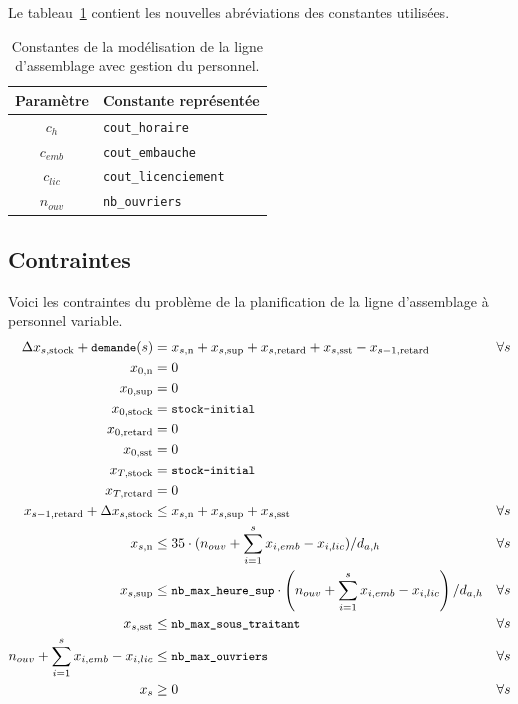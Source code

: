 \documentclass[12pt,oneside,a4paper]{article}
\newcommand{\myX}[2]{x_{#1,\text{#2}}}
\newcommand{\xSemaine}[1]{\myX{s}{#1}}
\newcommand{\xn}{\xSemaine{n}}
\newcommand{\xsup}{\xSemaine{sup}}
\newcommand{\xstock}{\xSemaine{stock}}
\newcommand{\xretard}{\xSemaine{retard}}
\newcommand{\xsst}{\xSemaine{sst}}
\newcommand{\texttts}[1]{{\small\texttt{#1}}}
\begin{document}
Le tableau~\ref{tab:constantesQuestion7} contient les nouvelles abréviations
des constantes utilisées.
\begin{table}[h]
  \begin{center}
  \begin{tabular}{|c|l|}
    \hline
    Paramètre & Constante représentée \\
    \hline
    \hline
    $c_{h}$ & \texttt{cout\_horaire} \\
    \hline
    $c_{emb}$ & \texttt{cout\_embauche} \\
    \hline
    $c_{lic}$ & \texttt{cout\_licenciement} \\
    \hline
    $n_{ouv}$ & \texttt{nb\_ouvriers} \\
    \hline
  \end{tabular}
  \caption{Constantes de la modélisation de la ligne d'assemblage
  avec gestion du personnel.}
  \label{tab:constantesQuestion7}
  \end{center}
\end{table}

\subsection*{Contraintes}
Voici les contraintes du problème de la planification 
de la ligne d’assemblage à personnel variable.
\begin{align*}
  \Delta\xstock + \texttts{demande}(s) &= \xn + \xsup 
  + \xretard + \xsst - \myX{s-1}{retard} &\forall s \\
  \myX{0}{n}&= 0 \\
  \myX{0}{sup}&= 0 \\
  \myX{0}{stock} &= \texttts{stock-initial} \\
  \myX{0}{retard}&= 0 \\
  \myX{0}{sst}&= 0 \\
  \myX{T}{stock} &= \texttts{stock-initial} \\
  \myX{T}{retard}&= 0 \\
  \myX{s-1}{retard} + \Delta\xstock &\leq \xn + \xsup + \xsst &\forall s \\
  \xn &\leq 35\cdot (n_{ouv} + \sum_{i=1}^{s} x_{i,emb} - x_{i,lic})/ d_{a,h}
  &\forall s \\
  \xsup &\leq \texttts{nb\_max\_heure\_sup}\cdot \left(n_{ouv} + \sum_{i=1}^{s} x_{i,emb} - x_{i,lic} \right)/ d_{a,h}
  &\forall s \\
  \xsst &\leq \texttts{nb\_max\_sous\_traitant} &\forall s \\
  n_{ouv} + \sum_{i=1}^{s} x_{i,emb} - x_{i,lic} &\leq \texttts{nb\_max\_ouvriers}  &\forall s \\
  x_s &\geq 0 &\forall s
\end{align*}
\end{document}
